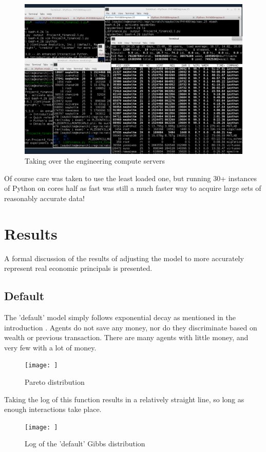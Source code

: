 \documentclass[12pt]{article} %
\begin{document}
\begin{figure}
	\includegraphics[scale=0.75]{LOL.png}
	\centering
	\caption{Taking over the engineering compute servers}
	\label{fig:computeuse}
\end{figure}

Of course care was taken to use the least loaded one, but running 30+ instances
of Python on cores half as fast was still a much faster way to acquire large
sets of reasonably accurate data!

\section{Results}
A formal discussion of the results of adjusting the model to more accurately
represent real economic principals is presented.

\subsection{Default}
The 'default' model simply follows exponential decay as mentioned in the
introduction \cite{Pareto}. Agents do not save any money, nor do they
discriminate based on wealth or previous transaction. There are many agents
with little money, and very few with a lot of money.
\newcommand{\scaleResults}{0.75}
\begin{figure}
	\texttt{[image: ]}
	\caption{Pareto distribution}
\end{figure}

Taking the log of this function results in a relatively straight line, so long
as enough interactions take place.
\begin{figure}
	\texttt{[image: ]}
	\caption{Log of the 'default' Gibbs distribution}
\end{figure}
\end{document}
